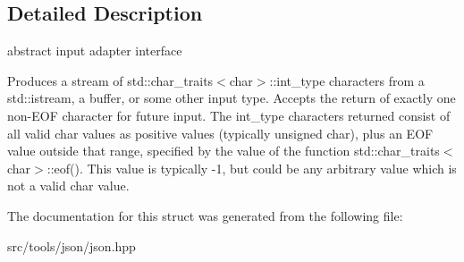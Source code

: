 \subsection{Detailed Description}
abstract input adapter interface 

Produces a stream of std\+::char\+\_\+traits$<$char$>$\+::int\+\_\+type characters from a std\+::istream, a buffer, or some other input type. Accepts the return of exactly one non-\/\+E\+OF character for future input. The int\+\_\+type characters returned consist of all valid char values as positive values (typically unsigned char), plus an E\+OF value outside that range, specified by the value of the function std\+::char\+\_\+traits$<$char$>$\+::eof(). This value is typically -\/1, but could be any arbitrary value which is not a valid char value. 

The documentation for this struct was generated from the following file\+:\begin{DoxyCompactItemize}
\item 
src/tools/json/json.\+hpp\end{DoxyCompactItemize}
